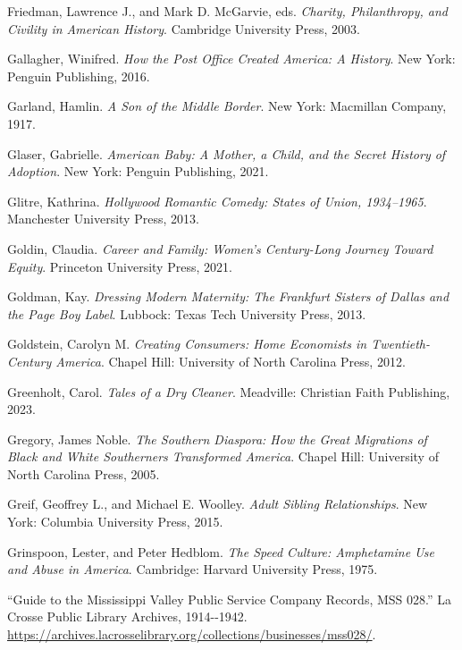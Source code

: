 \documentclass[
  letterpaper,
]{book}
\newlength{\cslhangindent}
\newenvironment{CSLReferences}[2] %
 {\begin{list}{}{%
  \setlength{\itemindent}{0pt}
  \setlength{\leftmargin}{0pt}
  \setlength{\parsep}{0pt}
  \ifodd #1
   \setlength{\leftmargin}{\cslhangindent}
   \setlength{\itemindent}{-1\cslhangindent}
  \fi
  \setlength{\itemsep}{#2\baselineskip}}}
 {\end{list}}
\begin{document}
\begin{CSLReferences}{1}{0}
Friedman, Lawrence J., and Mark D. McGarvie, eds. \emph{Charity,
Philanthropy, and Civility in American History}. Cambridge University
Press, 2003.

Gallagher, Winifred. \emph{How the Post Office Created America: A
History}. New York: Penguin Publishing, 2016.

Garland, Hamlin. \emph{A Son of the Middle Border}. New York: Macmillan
Company, 1917.

Glaser, Gabrielle. \emph{American Baby: A Mother, a Child, and the
Secret History of Adoption}. New York: Penguin Publishing, 2021.

Glitre, Kathrina. \emph{Hollywood Romantic Comedy: States of Union,
1934--1965}. Manchester University Press, 2013.

Goldin, Claudia. \emph{Career and Family: Women's Century-Long Journey
Toward Equity}. Princeton University Press, 2021.

Goldman, Kay. \emph{Dressing Modern Maternity: The Frankfurt Sisters of
Dallas and the Page Boy Label}. Lubbock: Texas Tech University Press,
2013.

Goldstein, Carolyn M. \emph{Creating Consumers: Home Economists in
Twentieth-Century America}. Chapel Hill: University of North Carolina
Press, 2012.

Greenholt, Carol. \emph{Tales of a Dry Cleaner}. Meadville: Christian
Faith Publishing, 2023.

Gregory, James Noble. \emph{The Southern Diaspora: How the Great
Migrations of Black and White Southerners Transformed America}. Chapel
Hill: University of North Carolina Press, 2005.

Greif, Geoffrey L., and Michael E. Woolley. \emph{Adult Sibling
Relationships}. New York: Columbia University Press, 2015.

Grinspoon, Lester, and Peter Hedblom. \emph{The Speed Culture:
Amphetamine Use and Abuse in America}. Cambridge: Harvard University
Press, 1975.

{``Guide to the Mississippi Valley Public Service Company Records, MSS
028.''} La Crosse Public Library Archives, 1914-\/-1942.
\url{https://archives.lacrosselibrary.org/collections/businesses/mss028/}.


\end{CSLReferences}
\end{document}
